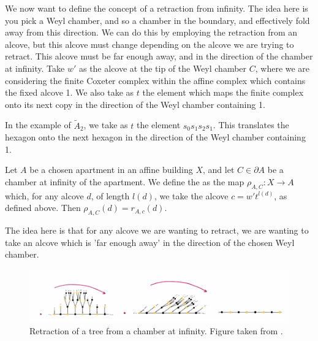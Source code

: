\documentclass[11pt]{article}
\begin{document}
We now want to define the concept of a retraction from infinity. The idea here is you pick a Weyl chamber, and so a chamber in the boundary, and effectively fold away from this direction. We can do this by employing the retraction from an alcove, but this alcove must change depending on the alcove we are trying to retract. This alcove must be far enough away, and in the direction of the chamber at infinity. Take $w'$ as the alcove at the tip of the Weyl chamber $C$, where we are considering the finite Coxeter complex within the affine complex which contains the fixed alcove 1. We also take as $t$ the element which maps the finite complex onto its next copy in the direction of the Weyl chamber containing 1. 


In the example of $\tilde{A}_2$, we take as $t$ the element $s_0s_1s_2s_1$. This translates the hexagon onto the next hexagon in the direction of the Weyl chamber containing 1. 

\begin{definition}
    Let $A$ be a chosen apartment in an affine building $X$, and let $C\in \partial A$ be a chamber at infinity of the apartment. We define the  as the map $\rho_{A,C}:X\longrightarrow A$ which, for any alcove $d$, of length $l(d)$, we take the alcove $c=w't^{l(d)}$, as defined above. Then $\rho_{A,C}(d)=r_{A,c}(d)$.
    
\end{definition}
The idea here is that for any alcove we are wanting to retract, we are wanting to take an alcove which is 'far enough away' in the direction of the chosen Weyl chamber. 
\begin{figure}[!htbp]
    \begin{center}
    \includegraphics[scale=0.7]{Screenshot 2023-04-18 at 14.53.25.png}
    \end{center}
    \caption{Retraction of a tree from a chamber at infinity. Figure taken from \cite[p.26]{WILD}.}
\end{figure}
\end{document}
